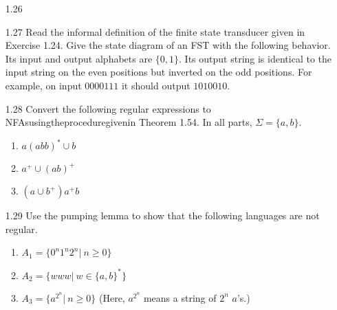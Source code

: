 \begin{enumerate}

    \item [1.26]
    \item [1.27]
          Read the informal definition of the finite state transducer given in Exercise 1.24. Give the state diagram of an FST with the following behavior. Its input and output alphabets are $\{0,1\}$. Its output string is identical to the input string on the even positions but inverted on the odd positions. For example, on input $0000111$ it should output $1010010$.

    \item [1.28]
          Convert the following regular expressions to NFAsusingtheproceduregivenin Theorem 1.54. In all parts, $\Sigma=\{a,b\}$. \begin{enumerate}
              \item $a(abb)^\ast \cup b$
              \item $a^+ \cup (ab)^+$
              \item $(a \cup b^+)a^+b$
          \end{enumerate}
    \item [1.29]
          Use the pumping lemma to show that the following languages are not regular.
          \begin{enumerate}
              \item $A_1 =\{0^n 1^n 2^n | ~n \geq 0\}$
              \item $A_2 =\{www|~w \in \{a,b\}^\ast\}$
              \item $A_3 = \{ a^{2^n} | ~n \geq 0\}$  (Here, $a^{2^n}$ means a string of $2^n$ $a$’s.)
          \end{enumerate}
\end{enumerate}
